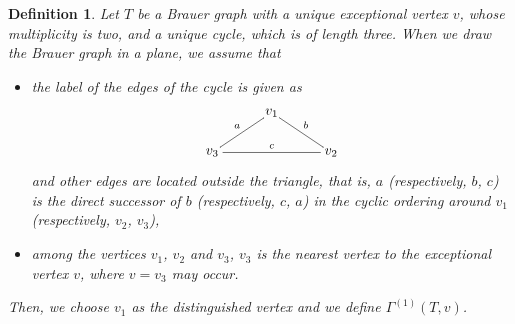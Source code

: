 \documentclass[12pt]{amsart}
\newtheorem{definition}[thm]{Definition}
\numberwithin{equation}{thm}
\newcounter{ni}
\begin{document}
\begin{definition}\label{D defn III}
Let $T$ be a Brauer graph with a unique exceptional vertex $v$, whose multiplicity is two, 
and a unique cycle, which is of length three. When we draw the Brauer graph in a plane, 
we assume that
\begin{itemize}
\item
the label of the edges of the cycle is given as
 \[\begin{xy}
(0,0)*[o]+{v_{3}}="2",(30,0)*[o]+{v_{2}}="3",(15,10)*[o]+{v_{1}}="1",
\ar @{-}"1";"2"_{a}
\ar @{-}"2";"3"^{c}
\ar @{-}"1";"3"^{b}
\end{xy}\] 
and other edges are located outside the triangle, that is, 
$a$ (respectively, $b$, $c$) is the direct successor of $b$ (respectively, $c$, $a$) 
in the cyclic ordering around $v_{1}$ (respectively, $v_{2}$, $v_{3}$),
\item
among the vertices $v_{1}$, $v_{2}$ and $v_{3}$, $v_{3}$ is the nearest vertex
to the exceptional vertex $v$, where $v=v_{3}$ may occur. 
\end{itemize}
Then, we choose $v_1$ as the distinguished vertex and we define $\Gamma^{(1)}(T,v)$.


\end{definition}
\end{document}

